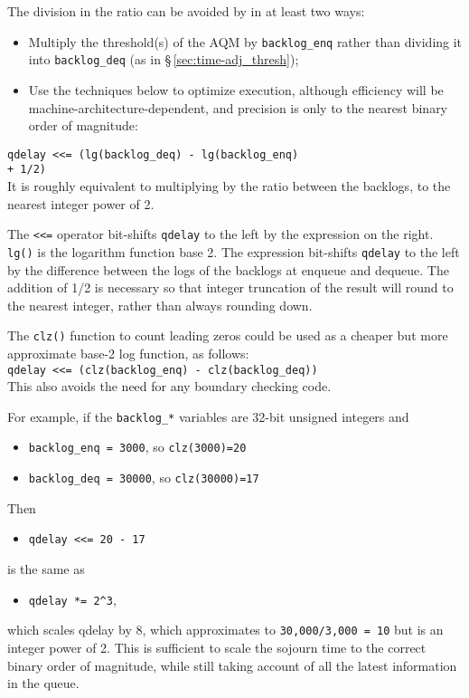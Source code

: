 The division in the ratio can be avoided by in at least two ways:
\begin{itemize}[nosep]
	\item Multiply the threshold(s) of the AQM by \texttt{backlog\_enq} rather than dividing it into \texttt{backlog\_deq} (as in \S\,\ref{sec:time-adj_thresh});
	\item Use the techniques below to optimize execution, although efficiency will be machine-architecture-dependent, and precision is only to the nearest binary order of magnitude:
\end{itemize}

{\small\texttt{qdelay <<= (lg(backlog\_deq) - lg(backlog\_enq)\\+ 1/2)}}\\
It is roughly equivalent to multiplying by the ratio between the backlogs, to the nearest integer power of 2.

The \texttt{<<=} operator bit-shifts \texttt{qdelay} to the left by the expression on the right. \texttt{lg()} is the logarithm function base 2. The expression bit-shifts \texttt{qdelay} to the left by the difference between the logs of the backlogs at enqueue and dequeue. The addition of 1/2 is necessary so that integer truncation of the result will round to the nearest integer, rather than always rounding down. 

The \texttt{clz()} function to count leading zeros could be used as a cheaper but more approximate base-2 log function, as follows:\\
{\small\texttt{qdelay <<= (clz(backlog\_enq) - clz(backlog\_deq))}}\\
This also avoids the need for any boundary checking code.

For example, if the \texttt{backlog\_*} variables are 32-bit unsigned integers and
\begin{itemize}[nosep]
	\item[] \texttt{backlog\_enq = 3000}, so \texttt{clz(3000)=20}
	\item[] \texttt{backlog\_deq = 30000}, so \texttt{clz(30000)=17}
\end{itemize}
Then
\begin{itemize}[nosep]
	\item[] \texttt{qdelay <<= 20 - 17}
\end{itemize}
is the same as
\begin{itemize}[nosep]
    \item[] \texttt{qdelay *= 2\^{}3},\\
\end{itemize}
which scales qdelay by 8, which approximates to \texttt{30,000/3,000 = 10} but is an integer power of 2. This is sufficient to scale the sojourn time to the correct binary order of magnitude, while still taking account of all the latest information in the queue.

